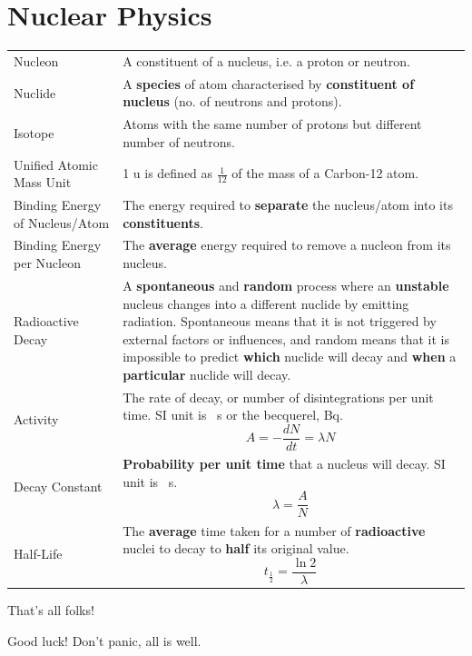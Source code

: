 \documentclass[a4paper,11pt]{article}
\begin{document}
	\section{Nuclear Physics}
	\begin{center}
		\renewcommand{\arraystretch}{1.2}
		\begin{tabular}{@{} l p{10cm} @{}}
			\toprule
			Nucleon & A constituent of a nucleus, i.e. a proton or neutron.\\
			Nuclide & A \textbf{species} of atom characterised by \textbf{constituent of nucleus} (no. of neutrons and protons).\\
			Isotope & Atoms with the same number of protons but different number of neutrons.\\
			Unified Atomic Mass Unit & 1 u is defined as $\frac{1}{12}$ of the mass of a Carbon-12 atom.\\
			Binding Energy of Nucleus/Atom & The energy required to \textbf{separate} the nucleus/atom into its \textbf{constituents}.\\
			Binding Energy per Nucleon & The \textbf{average} energy required to remove a nucleon from its nucleus.\\
			Radioactive Decay & A \textbf{spontaneous} and \textbf{random} process where an \textbf{unstable} nucleus changes into a different nuclide by emitting radiation. Spontaneous means that it is not triggered by external factors or influences, and random means that it is impossible to predict \textbf{which} nuclide will decay and \textbf{when} a \textbf{particular} nuclide will decay.\\
			Activity & The rate of decay, or number of disintegrations per unit time. SI unit is \si{\per\second} or the becquerel, \si{\becquerel}. $$A = -\frac{dN}{dt} = \lambda N$$ \vspace*{-\baselineskip}\\
			Decay Constant & \textbf{Probability per unit time} that a nucleus will decay. SI unit is \si{\per\second}. $$\lambda = \frac{A}{N}$$ \vspace*{-\baselineskip}\\
			Half-Life & The \textbf{average} time taken for a number of \textbf{radioactive} nuclei to decay to \textbf{half} its original value. $$t_{\frac{1}{2}} = \frac{\ln 2}{\lambda}$$ \vspace*{-\baselineskip}\\
			\bottomrule
		\end{tabular}
	\end{center}
	\vspace{2cm}
	\begin{center}
		{\LARGE That's all folks!}
		
		{\huge Good luck! Don't panic, all is well.}
	\end{center}
\end{document}
